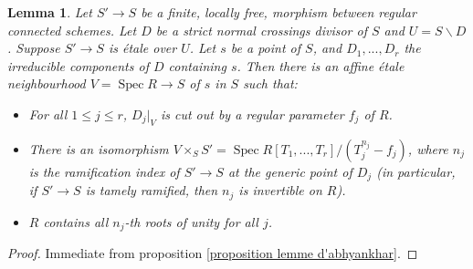 \documentclass{article}
\DeclareMathOperator{\spec}{Spec}
\newtheorem{lem}[thm]{Lemma}
\theoremstyle{definition}
\theoremstyle{remark}
\begin{document}
\begin{lem}\label{lemme local-global}
Let $S'\longrightarrow S$ be a finite, locally free, morphism between regular connected schemes. Let $D$ be a strict normal crossings divisor of $S$ and $U=S\backslash D$. Suppose $S'\longrightarrow S$ is \'etale over $U$. Let $s$ be a point of $S$, and $D_1,...,D_r$ the irreducible components of $D$ containing $s$. Then there is an affine \'etale neighbourhood $V=\spec R\longrightarrow S$ of $s$ in $S$ such that:
\begin{itemize}
\item For all $1\leq j\leq r$, $D_j|_V$ is cut out by a regular parameter $f_j$ of $R$.
\item There is an isomorphism $V\times_S S'=\spec R[T_1,...,T_r]/(T_j^{n_j}-f_j)$, where $n_j$ is the ramification index of $S'\longrightarrow S$ at the generic point of $D_j$ (in particular, if $S'\longrightarrow S$ is tamely ramified, then $n_j$ is invertible on $R$).
\item $R$ contains all $n_j$-th roots of unity for all $j$.
\end{itemize}
\end{lem}

\begin{proof}
Immediate from proposition \ref{proposition lemme d'abhyankhar}.
\end{proof}
\end{document}
